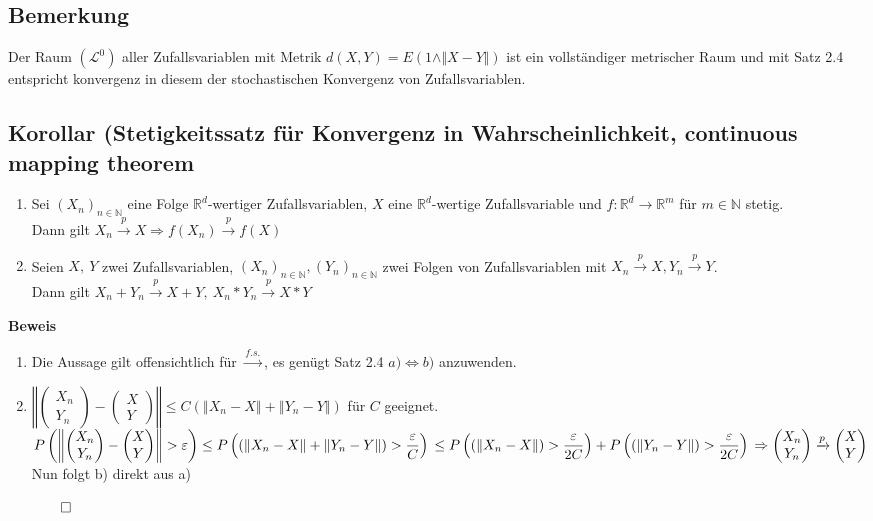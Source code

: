 \documentclass[german,10pt,oneside, fleqn, a4paper]{article}
\newcommand {\R}	{\mathbb{R}}
\newcommand {\N}	{\mathbb{N}}
\newcommand{\Ra}	{\Rightarrow}
\newcommand{\brc}[1]{\left(#1\right)}
\newcommand{\norm}[1]{\left\Vert #1 \right\Vert}
\newcommand{\QED}{\begin{flushright}$\qed$\end{flushright}}
\newcommand{\mat}[1]{\begin{pmatrix}#1\end{pmatrix}}
\newcommand{\mc}[1]{\mathcal{#1}}
\newcommand{\1}[1]{1_{#1}}
\newcommand{\2}[1]{\1{\brac{#1}}}
\begin{document}
\subsection{Bemerkung}
Der Raum $(\mc{L}^0)$ aller Zufallsvariablen mit Metrik $d(X,Y)=E(1\wedge\Vert X-Y\Vert)$ ist ein vollständiger metrischer Raum und mit Satz 2.4 entspricht konvergenz in diesem der stochastischen Konvergenz von Zufallsvariablen.

\subsection{Korollar (Stetigkeitssatz für Konvergenz in Wahrscheinlichkeit, continuous mapping theorem}
\label{2.6}
\begin{enumerate}[label=(\alph*)]
\item Sei $(X_n)_{n\in\N}$ eine Folge $\R^d$-wertiger Zufallsvariablen, $X$ eine $\R^d$-wertige Zufallsvariable und $f:\R^d\rightarrow\R^m$ für $m\in\N$ stetig.\\
Dann gilt $X_n\xrightarrow{p}X\Rightarrow f(X_n)\xrightarrow{p}f(X)$
\item Seien $X,\ Y$ zwei Zufallsvariablen, $(X_n)_{n\in\N},(Y_n)_{n\in\N}$ zwei Folgen von Zufallsvariablen mit $X_n\xrightarrow{p}X,Y_n\xrightarrow{p}Y$.\\
Dann gilt $X_n+Y_n\xrightarrow{p}X+Y,\ X_n*Y_n\xrightarrow{p}X*Y$
\end{enumerate}

\textbf{Beweis}\\
\begin{enumerate}[label=(\alph*)]
\item Die Aussage gilt offensichtlich für $\xrightarrow{f.s.}$, es genügt Satz 2.4 $a)\Leftrightarrow b)$ anzuwenden.	
\item 
$\norm{\mat{X_n\\Y_n}-\mat{X\\Y}}\leq C\brc{\norm{X_n-X}+\norm{Y_n-Y}}$ für $C$ geeignet.\\
$P\brc{\norm{\mat{X_n\\Y_n}-\mat{X\\Y}}>\varepsilon}\leq P\brc{\brc{\norm{X_n-X}+\norm{Y_n-Y}}>\dfrac{\varepsilon}{C}} \\
\leq P\brc{\brc{\norm{X_n-X}}>\dfrac{\varepsilon}{2C}}+P\brc{\brc{\norm{Y_n-Y}}>\dfrac{\varepsilon}{2C}} \\
\Ra \mat{X_n\\Y_n}\xrightarrow{p}\mat{X\\Y}$\\
Nun folgt b) direkt aus a)\QED

\end{enumerate}
\end{document}
